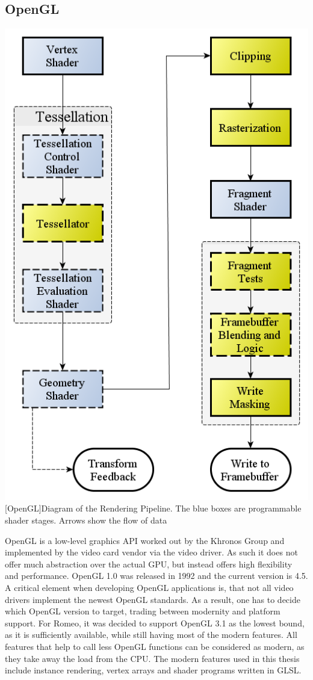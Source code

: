 \subsection{\ac{OpenGL}}

\vspace{1em}
\begin{minipage}{\linewidth}
    \centering
    \includegraphics[width=0.5\linewidth]{graphics/RenderingPipeline.png}
    [OpenGL]{Diagram of the Rendering Pipeline. The blue boxes are programmable shader stages. Arrows show the flow of data\cite{OpenGLPipeline}}
    \label{fig:opengl}
\end{minipage}



\ac{OpenGL} is a low-level graphics API worked out by the Khronos Group\cite{Khronos} and implemented by the video card vendor via the video driver. 
As such it does not offer much abstraction over the actual \ac{GPU}, but instead offers high flexibility and performance.
\ac{OpenGL} 1.0 was released in 1992 and the current version is 4.5.
A critical element when developing \ac{OpenGL} applications is, that not all video drivers implement the newest \ac{OpenGL} standards.
As a result, one has to decide which \ac{OpenGL} version to target, trading between modernity and platform support.
For Romeo, it was decided to support \ac{OpenGL} 3.1 as the lowest bound, as it is sufficiently available, while still having most of the modern features.
All features that help to call less OpenGL functions can be considered as modern, as they take away the load from the CPU.
The modern features used in this thesis include instance rendering, vertex arrays and shader programs written in \ac{GLSL}.

